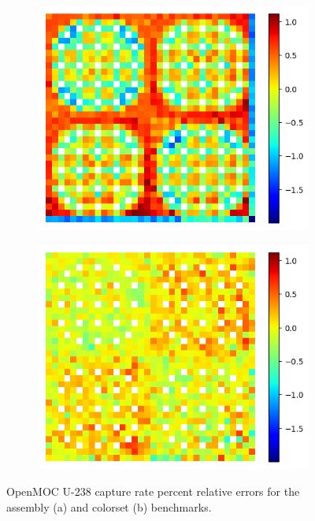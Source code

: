 \begin{figure}[h!]
\begin{subfigure}{0.45\textwidth}
  \centering
  \includegraphics[width=\linewidth]{figures/reflector/capt-null-errors}
  \caption{}
  \label{fig:reflector-capt-null-error}
\end{subfigure}%
\begin{subfigure}{0.45\textwidth}
  \centering
  \includegraphics[width=\linewidth]{figures/reflector/capt-degenerate-errors}
  \caption{}
  \label{fig:reflector-capt-degen-error}
\end{subfigure}
\caption{OpenMOC U-238 capture rate percent relative errors for the assembly (a) and colorset (b) benchmarks.}
\label{fig:capt-errors}
\end{figure}
